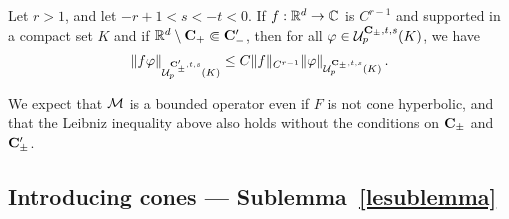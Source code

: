 \documentclass[10pt,twoside]{amsart}
\begin{document}
\begin{lemma}
\label{LeibSobhh}
Let $r>1$, and let $-r+1<s<-t<0$. If $f:\mathbb{R}^d\to \mathbb{C}$
is $C^{r-1}$ and supported in a compact
set $K$ and if   $\mathbb{R}^d \setminus \mathbf{C}_+ \Subset\mathbf{C}'_- $,
then  for all $\varphi \in\mathcal{U}^{\mathbf{C}_\pm, t,s}_p(K)$, we have
$$
\|f \varphi\|_{\mathcal{U}^{\mathbf{C}_\pm',t,s}_p(K)}\le
 C
\|f \|_{C^{r-1}}  \|\varphi\|_{\mathcal{U}^{\mathbf{C}_\pm, t,s}_p(K)}\, .
$$
\end{lemma}

We expect that $\mathcal{M}$ is a bounded operator even if
$F$ is not cone hyperbolic,  and that the Leibniz inequality 
above also holds without the conditions on $\mathbf{C}_\pm$ and $\mathbf{C}'_\pm$.











\subsection{Introducing cones --- Sublemma~\ref{lesublemma}}\label{PPPP}
\end{document}
